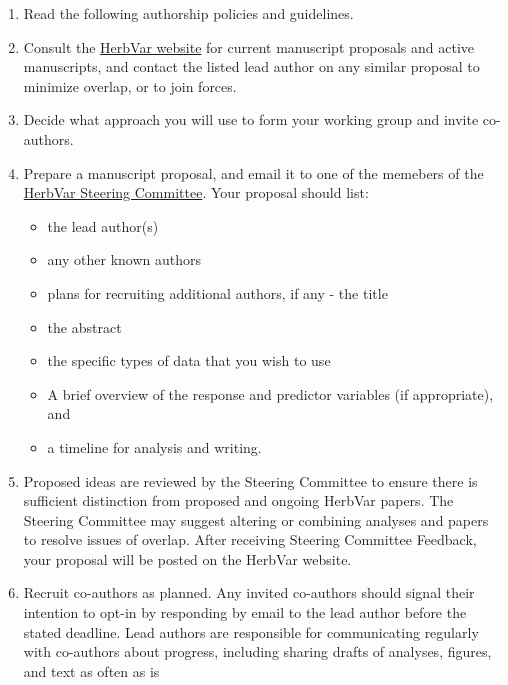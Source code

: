 \documentclass[
  letterpaper,
  oneside,
  open=any]{scrbook}
\providecommand{\tightlist}{%
  \setlength{\itemsep}{0pt}\setlength{\parskip}{0pt}}\usepackage{longtable,booktabs,array}
\begin{document}
\begin{enumerate}
\def\labelenumi{\arabic{enumi}.}
\item
  Read the following authorship policies and guidelines.
\item
  Consult the \href{https://herbvar.org/}{HerbVar website} for current
  manuscript proposals and active manuscripts, and contact the listed
  lead author on any similar proposal to minimize overlap, or to join
  forces.
\item
  Decide what approach you will use to form your working group and
  invite co-authors.
\item
  Prepare a manuscript proposal, and email it to one of the memebers of
  the \href{https://herbvar.org/leadership.html}{HerbVar Steering
  Committee}. Your proposal should list:

  \begin{itemize}
  \tightlist
  \item
    the lead author(s)\\
  \item
    any other known authors\\
  \item
    plans for recruiting additional authors, if any - the title\\
  \item
    the abstract\\
  \item
    the specific types of data that you wish to use\\
  \item
    A brief overview of the response and predictor variables (if
    appropriate), and
  \item
    a timeline for analysis and writing.
  \end{itemize}
\item
  Proposed ideas are reviewed by the Steering Committee to ensure there
  is sufficient distinction from proposed and ongoing HerbVar papers.
  The Steering Committee may suggest altering or combining analyses and
  papers to resolve issues of overlap. After receiving Steering
  Committee Feedback, your proposal will be posted on the HerbVar
  website.
\item
  Recruit co-authors as planned. Any invited co-authors should signal
  their intention to opt-in by responding by email to the lead author
  before the stated deadline. Lead authors are responsible for
  communicating regularly with co-authors about progress, including
  sharing drafts of analyses, figures, and text as often as is

\end{enumerate}
\end{document}
